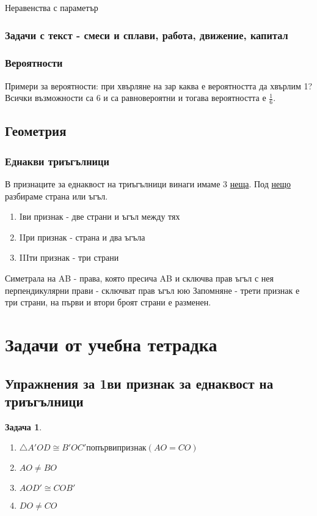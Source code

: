 \documentclass{article}
\theoremstyle{plain}
\newtheorem*{problem*}{Задача}
\begin{document}
	
	Неравенства с параметър
	\subsubsection{Задачи с текст - смеси и сплави, работа, движение, капитал}
	\subsubsection{Вероятности}
	Примери за вероятности: при хвърляне на зар каква е вероятността да хвърлим 1? Всички възможности са 6 и са равновероятни и тогава вероятността е $\frac{1}{6} $.
	
	\subsection{Геометрия}
	\subsubsection{Еднакви триъгълници}
	В признаците за еднаквост на триъгълници винаги имаме 3 \underline{неща}. Под \underline{нещо} разбираме страна или ъгъл. 
	\begin{enumerate}
		\item Iви признак - две страни и ъгъл между тях
		\item IIри признак - страна и два ъгъла
		\item IIIти признак - три страни
	\end{enumerate}


Симетрала на AB - права, която пресича AB и  сключва прав ъгъл с нея \\
перпендикулярни прави - сключват прав ъгъл юю
	Запомняне - трети признак е три страни, на първи и втори броят страни е разменен.
\section{Задачи от учебна тетрадка}
\subsection{Упражнения за 1ви признак за еднаквост на триъгълници }	


\begin{problem*}
	\begin{enumerate}
		\item 	$\triangle A'OD \cong B'OC' по първи признак(AO =CO ) $
		\item $AO \neq BO$ 
		\item $AOD' \cong COB'$
		\item $DO \neq CO$
	\end{enumerate}

\end{problem*}
\end{document}
